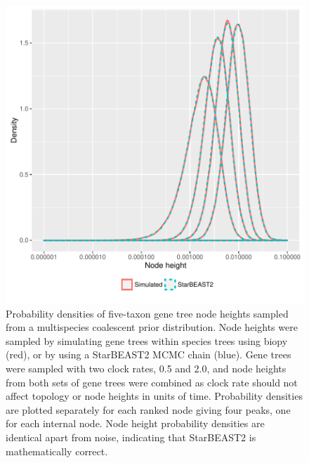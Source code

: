 \documentclass[12pt]{article}
\begin{document}
\begin{figure}[htb!]
\centering
\includegraphics[width=130mm]{gene_node_heights.pdf}
\caption
{Probability densities of five-taxon gene tree node heights sampled from a
multispecies coalescent prior distribution. Node heights were sampled by
simulating gene trees within species trees using biopy (red), or by using a
StarBEAST2 MCMC chain (blue). Gene trees were sampled with two clock rates, 0.5
and 2.0, and node heights from both sets of gene trees were combined as clock
rate should not affect topology or node heights in units of time. Probability
densities are plotted separately for each ranked node giving four peaks, one for
each internal node. Node height probability densities are identical apart from
noise, indicating that StarBEAST2 is mathematically correct.}
\label{fig:geneNodeHeights}
\end{figure}

\clearpage
\end{document}
